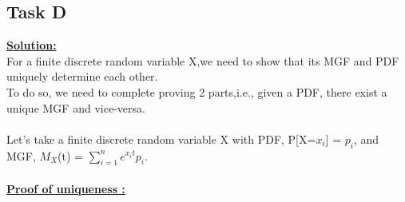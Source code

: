 \documentclass[12pt]{article}
\begin{document}
\subsection{Task D}
\textbf{\underline{Solution:}}\\
For a finite discrete random variable X,we need to show that  its MGF and PDF uniquely determine each other.\\
To do so, we need to complete proving 2 parts,i.e., given a PDF, there exist a unique MGF and vice-versa.\\
\\
Let's take a finite discrete random variable X with PDF, P[X=$x_i$] = $p_i$, and MGF, $M_X$(t) = $\sum_{i=1}^ne^{x_it}p_i$.\\
\\
\textbf{\underline{Proof of uniqueness :}}
\\
\end{document}
